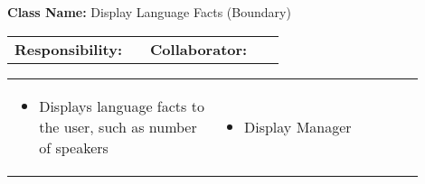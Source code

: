 \begin{cards}[]
    \textbf{Class Name:} Display Language Facts (Boundary)
    \tcbline
    \begin{tabular}{p{0.45\linewidth} | p{0.45\linewidth}}
        \textbf{Responsibility:}& 
        \textbf{Collaborator:}\\
    \end{tabular}
    \tcbline
    \begin{tabular}{p{0.45\linewidth} | p{0.45\linewidth}}
        \begin{itemize}
            \item Displays language facts to the user, such as number of speakers
        \end{itemize}
        &
        \begin{itemize}
            \item Display Manager
        \end{itemize}
    \end{tabular}
\end{cards}